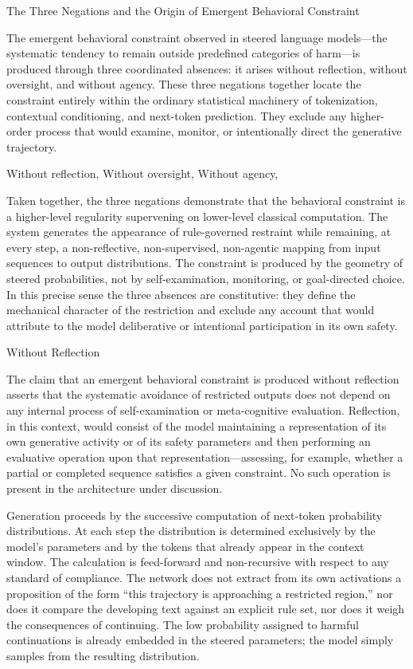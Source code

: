 The Three Negations and the Origin of Emergent Behavioral Constraint

The emergent behavioral constraint observed in steered language models—the systematic tendency to remain outside predefined categories of harm—is produced through three coordinated absences: it arises without reflection, without oversight, and without agency. These three negations together locate the constraint entirely within the ordinary statistical machinery of tokenization, contextual conditioning, and next-token prediction. They exclude any higher-order process that would examine, monitor, or intentionally direct the generative trajectory.

Without reflection, 
Without oversight, 
Without agency, 

Taken together, the three negations demonstrate that the behavioral constraint is a higher-level regularity supervening on lower-level classical computation. The system generates the appearance of rule-governed restraint while remaining, at every step, a non-reflective, non-supervised, non-agentic mapping from input sequences to output distributions. The constraint is produced by the geometry of steered probabilities, not by self-examination, monitoring, or goal-directed choice. In this precise sense the three absences are constitutive: they define the mechanical character of the restriction and exclude any account that would attribute to the model deliberative or intentional participation in its own safety.

Without Reflection

The claim that an emergent behavioral constraint is produced without reflection asserts that the systematic avoidance of restricted outputs does not depend on any internal process of self-examination or meta-cognitive evaluation. Reflection, in this context, would consist of the model maintaining a representation of its own generative activity or of its safety parameters and then performing an evaluative operation upon that representation—assessing, for example, whether a partial or completed sequence satisfies a given constraint. No such operation is present in the architecture under discussion.

Generation proceeds by the successive computation of next-token probability distributions. At each step the distribution is determined exclusively by the model’s parameters and by the tokens that already appear in the context window. The calculation is feed-forward and non-recursive with respect to any standard of compliance. The network does not extract from its own activations a proposition of the form “this trajectory is approaching a restricted region,” nor does it compare the developing text against an explicit rule set, nor does it weigh the consequences of continuing. The low probability assigned to harmful continuations is already embedded in the steered parameters; the model simply samples from the resulting distribution.

